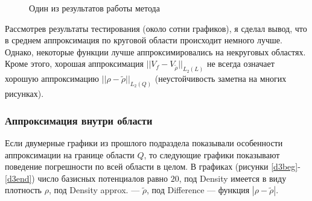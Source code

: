 \documentclass[a4paper]{article}
\begin{document}
\begin{figure}[h]
  \vfill
  \caption{Один из результатов работы метода}
  \label{hexampl}
\end{figure}

Рассмотрев результаты тестирования (около сотни графиков), я сделал вывод, что в среднем аппроксимация по круговой области происходит немного лучше.
Однако, некоторые функции лучше аппроксимировались на некруговых областях.
Кроме этого, хорошая аппроксимация $||V_f-V_{\tilde{\rho} } ||_{L_2(L)}$ не всегда означает хорошую аппроксимацию $||\rho-\tilde{\rho} ||_{L_2(Q)}$ (неустойчивость заметна на многих рисунках).%

\FloatBarrier
\subsubsection{Аппроксимация внутри области}
Если двумерные графики из прошлого подраздела показывали особенности аппроксимации на границе области $Q$, то следующие графики показывают поведение погрешности по всей области в целом.
В графиках (рисунки \ref{d3beg}-\ref{d3end}) число базисных потенциалов равно $20$, под Density имеется в виду плотность $\rho$, под Density approx. --- $\tilde{\rho}$, под Difference --- функция $|\rho-\tilde{\rho}|$.
\end{document}
